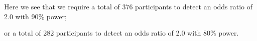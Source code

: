 \documentclass[
]{memoir}
\newenvironment{Shaded}{\begin{snugshade}}{\end{snugshade}}
\newcommand{\AttributeTok}[1]{\textcolor[rgb]{0.77,0.63,0.00}{#1}}
\newcommand{\CommentTok}[1]{\textcolor[rgb]{0.56,0.35,0.01}{\textit{#1}}}
\newcommand{\ConstantTok}[1]{\textcolor[rgb]{0.00,0.00,0.00}{#1}}
\newcommand{\DecValTok}[1]{\textcolor[rgb]{0.00,0.00,0.81}{#1}}
\newcommand{\FloatTok}[1]{\textcolor[rgb]{0.00,0.00,0.81}{#1}}
\newcommand{\FunctionTok}[1]{\textcolor[rgb]{0.00,0.00,0.00}{#1}}
\newcommand{\NormalTok}[1]{#1}
\begin{document}
Here we see that we require a total of 376 participants to detect an odds ratio of 2.0 with 90\% power;

\begin{Shaded}
\end{Shaded}

or a total of 282 participants to detect an odds ratio of 2.0 with 80\% power.

  
\end{document}
